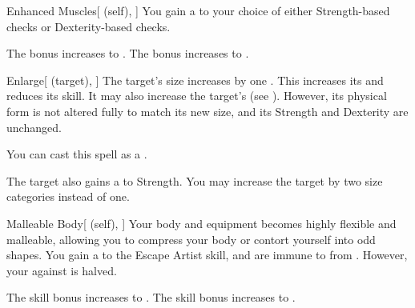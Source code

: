 \lowercase{\hypertarget{spell:Enhanced Muscles}{}}\label{spell:Enhanced Muscles}
\begin{attuneability}[Rank 4]{\hypertarget{spell:Enhanced Muscles}{Enhanced Muscles}}[ (self), ]
You gain a   to your choice of either Strength-based checks or Dexterity-based checks.

\rankline
{} The bonus increases to .
 The bonus increases to .
\end{attuneability}
\vspace{0.25em}



\lowercase{\hypertarget{spell:Enlarge}{}}\label{spell:Enlarge}
\begin{attuneability}[Rank 4]{\hypertarget{spell:Enlarge}{Enlarge}}[ (target), ]
The target's size increases by one .
This increases its  and reduces its  skill.
It may also increase the target's  (see ).
However, its physical form is not altered fully to match its new size, and its Strength and Dexterity are unchanged.

You can cast this spell as a .

\rankline
{} The target also gains a   to Strength.
 You may increase the target by two size categories instead of one.
\end{attuneability}
\vspace{0.25em}



\lowercase{\hypertarget{spell:Malleable Body}{}}\label{spell:Malleable Body}
\begin{attuneability}[Rank 4]{\hypertarget{spell:Malleable Body}{Malleable Body}}[ (self), ]
Your body and equipment becomes highly flexible and malleable, allowing you to compress your body or contort yourself into odd shapes.
You gain a   to the Escape Artist skill, and are immune to  from .
However, your  against  is halved.

\rankline
{} The skill bonus increases to .
 The skill bonus increases to .
\end{attuneability}
\vspace{0.25em}



